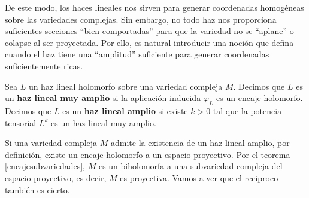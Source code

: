 	De este modo, los haces lineales nos sirven para generar coordenadas homogéneas sobre las variedades complejas. Sin embargo, no todo haz nos proporciona suficientes secciones \enquote{bien comportadas} para que la variedad no se \enquote{aplane} o colapse al ser proyectada. Por ello, es natural introducir una noción que defina cuando el haz tiene una \enquote{amplitud} suficiente para generar coordenadas suficientemente ricas.
	
	\begin{definition} 
		Sea $L$ un haz lineal holomorfo sobre una variedad compleja $M$. Decimos que $L$ es un \textbf{haz lineal muy amplio} si la aplicación inducida $\varphi_L$ es un encaje holomorfo.\\
		Decimos que $L$ es un \textbf{haz lineal amplio} si existe $k>0$ tal que la potencia tensorial $L^k$ es un haz lineal muy amplio.
	\end{definition}
	
	
	Si una variedad compleja $M$ admite la existencia de un haz lineal amplio, por definición, existe un encaje holomorfo a un espacio proyectivo. Por el teorema \ref{encajesubvariedades}, $M$ es un biholomorfa a una subvariedad compleja del espacio proyectivo, es decir, $M$ es proyectiva. Vamos a ver que el reciproco también es cierto.

